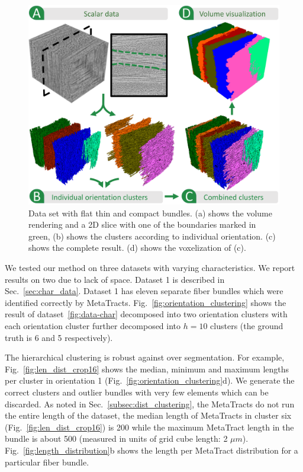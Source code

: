 \begin{figure}[tb]
\centering
	\includegraphics[width=\linewidth]{images_pvis/dataset2.pdf}
	\caption{Data set with flat thin and compact bundles. (a) shows the volume rendering and a 2D slice with one of the boundaries marked in green, (b) shows the clusters according to individual orientation. (c) shows the complete result. (d) shows the voxelization of (c).}
	\label{fig:prepreg}
\end{figure}


We tested our method on three datasets with varying characteristics. We report results on two due to lack of space.  
Dataset 1 is described in Sec.~\ref{sec:char_data}. Dataset 1 has eleven separate fiber bundles which were identified correctly by MetaTracts.
Fig.~\ref{fig:orientation_clustering} shows the result of dataset~\ref{fig:data-char} decomposed into two orientation clusters with each orientation cluster further decomposed into $h=10$ clusters (the ground truth is 6 and 5 respectively). 

The hierarchical clustering is robust against over segmentation. For example,
Fig.~\ref{fig:len_dist_crop16} shows the median, minimum and maximum lengths per cluster in orientation 1 (Fig.~\ref{fig:orientation_clustering}d). We generate the correct clusters and outlier bundles with very few elements which can be discarded. As noted in Sec.~\ref{subsec:dist_clustering}, the MetaTracts do not run the entire length of the dataset, the median length of MetaTracts in cluster six (Fig.~\ref{fig:len_dist_crop16}) is 200 while the maximum MetaTract length in the bundle is about 500 (measured in units of grid cube length: 2 $\mu m$). Fig.~\ref{fig:length_distribution}b shows the length per MetaTract distribution for a particular fiber bundle. 

